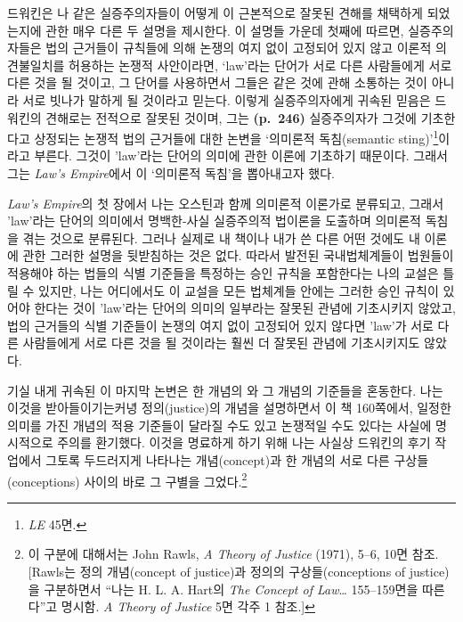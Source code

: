 드워킨은 나 같은 실증주의자들이 어떻게 이 근본적으로 잘못된 견해를
채택하게 되었는지에 관한 매우 다른 두 설명을 제시한다. 이 설명들 가운데
첫째에 따르면, 실증주의자들은 법의 근거들이 규칙들에 의해 논쟁의 여지
없이 고정되어 있지 않고 이론적 의견불일치를 허용하는 논쟁적 사안이라면,
`law'라는 단어가 서로 다른 사람들에게 서로 다른 것을 
될 것이고, 그 단어를 사용하면서 그들은 같은 것에 관해 소통하는 것이
아니라 서로 빗나가 말하게 될 것이라고 믿는다. 이렇게 실증주의자에게
귀속된 믿음은 드워킨의 견해로는 전적으로 잘못된 것이며, 그는
\textbf{(p.~246)} 실증주의자가 그것에 기초한다고 상정되는 논쟁적 법의
근거들에 대한 논변을 ‘의미론적 독침(semantic sting)’\footnote{\emph{LE}
  45면.}이라고 부른다. 그것이 'law'라는 단어의 의미에 관한 이론에
기초하기 때문이다. 그래서 그는 \emph{Law's Empire}에서 이 ‘의미론적
독침’을 뽑아내고자 했다.

\emph{Law's Empire}의 첫 장에서 나는 오스틴과 함께 의미론적 이론가로
분류되고, 그래서 'law'라는 단어의 의미에서 명백한-사실 실증주의적
법이론을 도출하며 의미론적 독침을 겪는 것으로 분류된다. 그러나 실제로 내
책이나 내가 쓴 다른 어떤 것에도 내 이론에 관한 그러한 설명을 뒷받침하는
것은 없다. 따라서 발전된 국내법체계들이 법원들이 적용해야 하는 법들의
식별 기준들을 특정하는 승인 규칙을 포함한다는 나의 교설은 틀릴 수
있지만, 나는 어디에서도 이 교설을 모든 법체계들 안에는 그러한 승인
규칙이 있어야 한다는 것이 'law'라는 단어의 의미의 일부라는 잘못된 관념에
기초시키지 않았고, 법의 근거들의 식별 기준들이 논쟁의 여지 없이 고정되어
있지 않다면 'law'가 서로 다른 사람들에게 서로 다른 것을  될
것이라는 훨씬 더 잘못된 관념에 기초시키지도 않았다.

기실 내게 귀속된 이 마지막 논변은 한 개념의 와 그 개념의
 기준들을 혼동한다. 나는 이것을 받아들이기는커녕
정의(justice)의 개념을 설명하면서 이 책 160쪽에서, 일정한 의미를 가진
개념의 적용 기준들이 달라질 수도 있고 논쟁적일 수도 있다는 사실에
명시적으로 주의를 환기했다. 이것을 명료하게 하기 위해 나는 사실상
드워킨의 후기 작업에서 그토록 두드러지게 나타나는 개념(concept)과 한
개념의 서로 다른 구상들(conceptions) 사이의 바로 그 구별을
그었다.\footnote{이 구분에 대해서는 John Rawls, \emph{A Theory of
  Justice} (1971), 5--6, 10면 참조. {[}Rawls는 정의 개념(concept of
  justice)과 정의의 구상들(conceptions of justice)을 구분하면서 “나는
  H. L. A. Hart의 \emph{The Concept of Law}\ldots{} 155--159면을
  따른다”고 명시함. \emph{A Theory of Justice} 5면 각주 1 참조.{]}}

